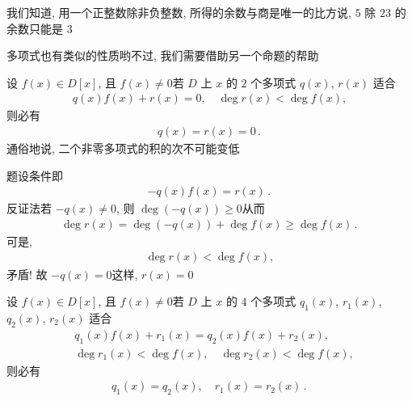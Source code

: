 我们知道, 用一个正整数除非负整数, 所得的余数与商是唯一的\period 比方说, $5$ 除 $23$ 的余数只能是 $3$\period

多项式也有类似的性质哟\period 不过, 我们需要借助另一个命题的帮助\period

\begin{proposition}
    设 $f(x) \in D[x]$, 且 $f(x) \neq 0$\period 若 $D$ 上 $x$ 的 $2$ 个多项式 $q(x)$, $r(x)$ 适合
    \begin{align*}
        q(x) f(x) + r(x) = 0, \quad \deg r(x) < \deg f(x),
    \end{align*}
    则必有
    \begin{align*}
        q(x) = r(x) = 0 \period
    \end{align*}
    通俗地说, 二个非零多项式的积的次不可能变低\period
\end{proposition}

\begin{pf}
    题设条件即
    \begin{align*}
        -q(x) f(x) = r(x) \period
    \end{align*}
    反证法\period 若 $-q(x) \neq 0$, 则 $\deg (-q(x)) \geq 0$\period 从而
    \begin{align*}
        \deg r(x) = \deg (-q(x)) + \deg f(x) \geq \deg f(x) \period
    \end{align*}
    可是,
    \begin{align*}
        \deg r(x) < \deg f(x),
    \end{align*}
    矛盾! 故 $-q(x) = 0$\period 这样, $r(x) = 0$\period
\end{pf}

\begin{proposition}
    设 $f(x) \in D[x]$, 且 $f(x) \neq 0$\period 若 $D$ 上 $x$ 的 $4$ 个多项式 $q_1 (x)$, $r_1 (x)$, $q_2 (x)$, $r_2 (x)$ 适合
    \begin{align*}
         & q_1 (x) f(x) + r_1 (x) = q_2 (x) f(x) + r_2 (x),          \\
         & \deg r_1 (x) < \deg f(x), \quad \deg r_2 (x) < \deg f(x),
    \end{align*}
    则必有
    \begin{align*}
        q_1 (x) = q_2 (x), \quad r_1 (x) = r_2 (x) \period
    \end{align*}
\end{proposition}

